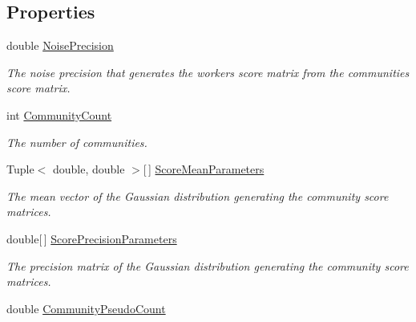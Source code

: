 \subsection*{Properties}
\begin{DoxyCompactItemize}
\item 
double \hyperlink{class_crowdsourcing_models_1_1_c_b_c_c_acb50efae296073d8f9a3cd67c59a76cb}{Noise\+Precision}
\begin{DoxyCompactList}\small\item\em The noise precision that generates the workers score matrix from the communities score matrix. \end{DoxyCompactList}\item 
int \hyperlink{class_crowdsourcing_models_1_1_c_b_c_c_ab5f136f59f47bf4c8b35c36b227ab88c}{Community\+Count}
\begin{DoxyCompactList}\small\item\em The number of communities. \end{DoxyCompactList}\item 
Tuple$<$ double, double $>$\mbox{[}$\,$\mbox{]} \hyperlink{class_crowdsourcing_models_1_1_c_b_c_c_a8ef0b4450b90f90056b63b9e91d0e019}{Score\+Mean\+Parameters}
\begin{DoxyCompactList}\small\item\em The mean vector of the Gaussian distribution generating the community score matrices. \end{DoxyCompactList}\item 
double\mbox{[}$\,$\mbox{]} \hyperlink{class_crowdsourcing_models_1_1_c_b_c_c_ac7e4f6e87b9a0da08b4ef2c5c55887ed}{Score\+Precision\+Parameters}
\begin{DoxyCompactList}\small\item\em The precision matrix of the Gaussian distribution generating the community score matrices. \end{DoxyCompactList}\item 
double \hyperlink{class_crowdsourcing_models_1_1_c_b_c_c_a2f2892733a8d5e66d64a5795f70c11f5}{Community\+Pseudo\+Count}

\end{DoxyCompactItemize}
